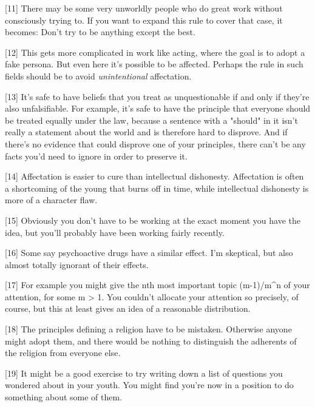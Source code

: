 [11] There may be some very unworldly people who do great work
                  without consciously trying to. If you want to expand this rule
                  to cover that case, it becomes: Don't try to be anything
                  except the best.

[12] This gets more complicated in work like acting, where the
                  goal is to adopt a fake persona. But even here it's possible
                  to be affected. Perhaps the rule in such fields should be to
                  avoid \emph{unintentional} affectation.

[13] It's safe to have beliefs that you treat as unquestionable
                  if and only if they're also unfalsifiable. For example, it's
                  safe to have the principle that everyone should be treated
                  equally under the law, because a sentence with a "should" in
                  it isn't really a statement about the world and is therefore
                  hard to disprove. And if there's no evidence that could
                  disprove one of your principles, there can't be any facts
                  you'd need to ignore in order to preserve it.

[14] Affectation is easier to cure than intellectual dishonesty.
                  Affectation is often a shortcoming of the young that burns off
                  in time, while intellectual dishonesty is more of a character
                  flaw.

[15] Obviously you don't have to be working at the exact moment
                  you have the idea, but you'll probably have been working
                  fairly recently.

[16] Some say psychoactive drugs have a similar effect. I'm
                  skeptical, but also almost totally ignorant of their
                  effects.

[17] For example you might give the nth most important topic
                  (m-1)/m\textasciicircum{}n of your attention, for some m > 1. You couldn't
                  allocate your attention so precisely, of course, but this at
                  least gives an idea of a reasonable distribution.

[18] The principles defining a religion have to be mistaken.
                  Otherwise anyone might adopt them, and there would be nothing
                  to distinguish the adherents of the religion from everyone
                  else.

[19] It might be a good exercise to try writing down a list of
                  questions you wondered about in your youth. You might find
                  you're now in a position to do something about some of
                  them.

